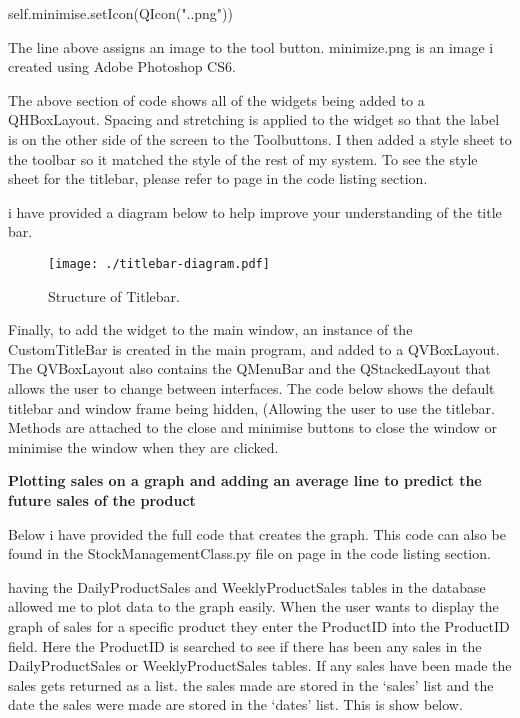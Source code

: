 \begin{python}
self.minimise.setIcon(QIcon(".\SystemImages\minimize.png"))
\end{python}

The line above assigns an image to the tool button. minimize.png is an image i created using Adobe Photoshop CS6.


The above section of code shows all of the widgets being added to a QHBoxLayout. Spacing and stretching is applied to the widget so that the label is on the other side of the screen to the Toolbuttons. I then added a style sheet to the toolbar so it matched the style of the rest of my system. To see the style sheet for the titlebar, please refer to page \pageref{fig:CustomToolbarClass} in the code listing section. \par

i have provided a diagram below to help improve your understanding of the title bar.



\begin{figure}[H]
    \texttt{[image: ./titlebar-diagram.pdf]}
    \caption{Structure of Titlebar.} \label{fig:titlebar-diagram}
\end{figure}

Finally, to add the widget to the main window, an instance of the CustomTitleBar is created in the main program, and added to a QVBoxLayout. The QVBoxLayout also contains the QMenuBar and the QStackedLayout that allows the user to change between interfaces. The code below shows the default titlebar and window frame being hidden, (Allowing the user to use the titlebar. Methods are attached to the close and minimise buttons to close the window or minimise the window when they are clicked.


\textbf{Plotting sales on a graph and adding an average line to predict the future sales of the product}

Below i have provided the full code that creates the graph. This code can also be found in the StockManagementClass.py file on page \pageref{fig:StockManagementClass} in the code listing section.


having the DailyProductSales and WeeklyProductSales tables in the database allowed me to plot data to the graph easily. When the user wants to display the graph of sales for a specific product they enter the ProductID into the ProductID field. Here the ProductID is searched to see if there has been any sales in the DailyProductSales or WeeklyProductSales tables. If any sales have been made the sales gets returned as a list. the sales made are stored in the `sales' list and the date the sales were made are stored in the `dates' list. This is show below.

